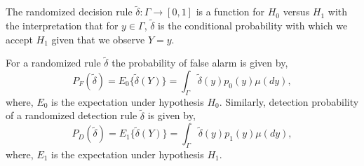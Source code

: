\documentclass[a4paper,english,12pt]{article}
\begin{document}
\begin{defn}
The randomized decision rule $\tilde{\delta}: \Gamma \rightarrow [0,1]$ is a function for $H_0$ versus $H_1$ with the interpretation that for $y \in \Gamma$, $\tilde{\delta}$ is the conditional probability with which we accept $H_1$ given that we observe $Y=y$. 
\end{defn}
For a randomized rule $\tilde{\delta}$ the probability of false alarm is given by, 
\begin{equation}
P_F(\tilde{\delta}) = E_0\{\tilde{\delta}(Y)\} = \int_{\Gamma} \tilde{\delta}(y) p_0(y) \mu (dy),
\end{equation} 
where, $E_0$ is the expectation under hypothesis $H_0$. Similarly, detection probability of a randomized detection rule $\tilde{\delta}$ is given by,
\begin{equation}
P_D(\tilde{\delta}) = E_1\{\tilde{\delta}(Y)\} = \int_{\Gamma} \tilde{\delta}(y) p_1(y) \mu (dy),
\end{equation} 
where, $E_1$ is the expectation under hypothesis $H_1$.
\end{document}
